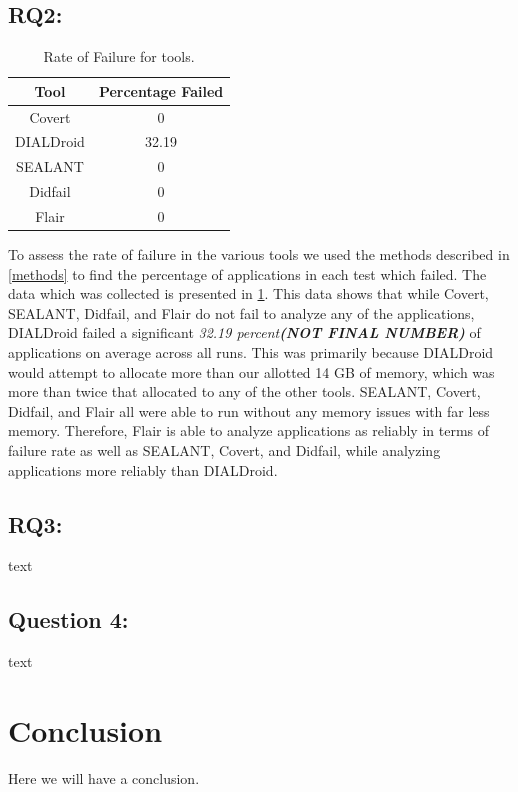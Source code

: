\documentclass[twocolumn]{article}
\begin{document}
	\subsection{RQ2:}
	
		\begin{table}[h]
		\begin{center}
			\begin{tabular}{ |c c| }
				\hline
				Tool & Percentage Failed\\
				\hline
				Covert & 0\\
				DIALDroid & 32.19\\
				SEALANT & 0\\
				Didfail & 0\\
				Flair & 0\\
				\hline
			\end{tabular}		
			\end{center}
			\label{table:2}
			\caption{Rate of Failure for tools.}
		\end{table}
		
		To assess the rate of failure in the various tools we used the methods described in \ref{methods} to find the percentage of applications in each test which failed. The data which was collected is presented in \ref{table:2}. This data shows that while Covert, SEALANT, Didfail, and Flair do not fail to analyze any of the applications, DIALDroid failed a significant \textit{32.19 percent\textbf{(NOT FINAL NUMBER)}} of applications on average across all runs. This was primarily because DIALDroid would attempt to allocate more than our allotted 14 GB of memory, which was more than twice that allocated to any of the other tools. SEALANT, Covert, Didfail, and Flair all were able to run without any memory issues with far less memory. Therefore, Flair is able to analyze applications as reliably in terms of failure rate as well as SEALANT, Covert, and Didfail, while analyzing applications more reliably than DIALDroid.
		
	\subsection{RQ3:}
		text
	\subsection{Question 4:}
		text


\section[3]{Conclusion}
Here we will have a conclusion.
\end{document}
